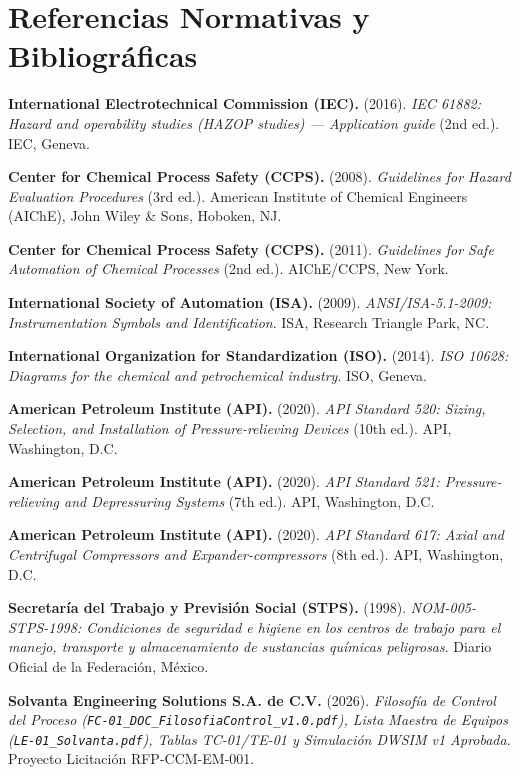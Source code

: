 \documentclass[10pt,letterpaper]{article}
\begin{document}
\section{Referencias Normativas y Bibliográficas}
\small
\begin{enumerate}[label={[\arabic*]}]
    \item \textbf{International Electrotechnical Commission (IEC).} (2016). \textit{IEC 61882: Hazard and operability studies (HAZOP studies) --- Application guide} (2nd ed.). IEC, Geneva.
    \item \textbf{Center for Chemical Process Safety (CCPS).} (2008). \textit{Guidelines for Hazard Evaluation Procedures} (3rd ed.). American Institute of Chemical Engineers (AIChE), John Wiley \& Sons, Hoboken, NJ.
    \item \textbf{Center for Chemical Process Safety (CCPS).} (2011). \textit{Guidelines for Safe Automation of Chemical Processes} (2nd ed.). AIChE/CCPS, New York.
    \item \textbf{International Society of Automation (ISA).} (2009). \textit{ANSI/ISA-5.1-2009: Instrumentation Symbols and Identification}. ISA, Research Triangle Park, NC.
    \item \textbf{International Organization for Standardization (ISO).} (2014). \textit{ISO 10628: Diagrams for the chemical and petrochemical industry}. ISO, Geneva.
    \item \textbf{American Petroleum Institute (API).} (2020). \textit{API Standard 520: Sizing, Selection, and Installation of Pressure-relieving Devices} (10th ed.). API, Washington, D.C.
    \item \textbf{American Petroleum Institute (API).} (2020). \textit{API Standard 521: Pressure-relieving and Depressuring Systems} (7th ed.). API, Washington, D.C.
    \item \textbf{American Petroleum Institute (API).} (2020). \textit{API Standard 617: Axial and Centrifugal Compressors and Expander-compressors} (8th ed.). API, Washington, D.C.
    \item \textbf{Secretaría del Trabajo y Previsión Social (STPS).} (1998). \textit{NOM-005-STPS-1998: Condiciones de seguridad e higiene en los centros de trabajo para el manejo, transporte y almacenamiento de sustancias químicas peligrosas}. Diario Oficial de la Federación, México.
    \item \textbf{Solvanta Engineering Solutions S.A. de C.V.} (2026). \textit{Filosofía de Control del Proceso (\texttt{FC-01\_DOC\_FilosofiaControl\_v1.0.pdf}), Lista Maestra de Equipos (\texttt{LE-01\_Solvanta.pdf}), Tablas TC-01/TE-01 y Simulación DWSIM v1 Aprobada}. Proyecto Licitación RFP-CCM-EM-001.
\end{enumerate}
\newpage
\end{document}
